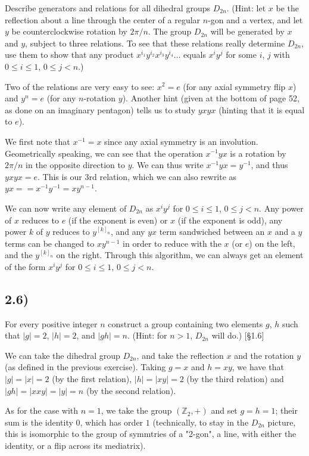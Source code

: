 Describe generators and relations for all dihedral groups $D_{2n}$. (Hint: let $x$ be the reflection about a line through the center of a regular $n$-gon and a vertex, and let $y$ be counterclockwise rotation by $2\pi/n$. The group $D_{2n}$ will be generated by $x$ and $y$, subject to three relations. To see that these relations really determine $D_{2n}$, use them to show that any product $x^{i_1} y^{i_2} x^{i_3} y^{i_4} \ldots$ equals $x^i y^j$ for some $i$, $j$ with $0 \leq i \leq 1$, $0 \leq j < n$.)

Two of the relations are very easy to see: $x^2 = e$ (for any axial symmetry flip $x$) and $y^n = e$ (for any $n$-rotation $y$). Another hint (given at the bottom of page 52, as done on an imaginary pentagon) tells us to study $yxyx$ (hinting that it is equal to $e$).

We first note that $x^{-1} = x$ since any axial symmetry is an involution. Geometrically speaking, we can see that the operation $x^{-1}yx$ is a rotation by $2\pi/n$ in the opposite direction to $y$. We can thus write $x^{-1}yx = y^{-1}$, and thus $yxyx = e$. This is our 3rd relation, which we can also rewrite as $yx = = x^{-1}y^{-1} = xy^{n-1}$.

We can now write any element of $D_{2n}$ as $x^i y^j$ for $0 \leq i \leq 1$, $0 \leq j < n$. Any power of $x$ reduces to $e$ (if the exponent is even) or $x$ (if the exponent is odd), any power $k$ of $y$ reduces to $y^{[k]_n}$, and any $yx$ term sandwiched between an $x$ and a $y$ terms can be changed to $xy^{n-1}$ in order to reduce with the $x$ (or $e$) on the left, and the $y^{[k]_n}$ on the right. Through this algorithm, we can always get an element of the form $x^i y^j$ for $0 \leq i \leq 1$, $0 \leq j < n$.

\subsection*{2.6)}

For every positive integer $n$ construct a group containing two elements $g$, $h$ such that $|g| = 2$, $|h| = 2$, and $|gh| = n$. (Hint: for $n > 1$, $D_{2n}$ will do.) [§1.6]

We can take the dihedral group $D_{2n}$, and take the reflection $x$ and the rotation $y$ (as defined in the previous exercise). Taking $g = x$ and $h = xy$, we have that $|g| = |x| = 2$ (by the first relation), $|h| = |xy| = 2$ (by the third relation) and $|gh| = |xxy| = |y| = n$ (by the second relation).

As for the case with $n = 1$, we take the group $(\mathbb{Z}_2, +)$ and set $g = h = 1$; their sum is the identity $0$, which has order $1$ (technically, to stay in the $D_{2n}$ picture, this is isomorphic to the group of symmtries of a "2-gon", a line, with either the identity, or a flip across its mediatrix).


